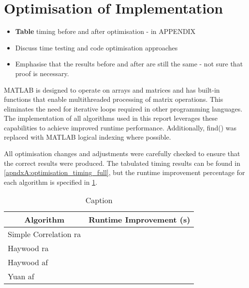 \documentclass[class=report,11pt,crop=false]{standalone}
\begin{document}
\section{Optimisation of Implementation \label{sec:V&V_optimisation}}
\begin{itemize}
    \item \textbf{Table} timing before and after optimisation - in APPENDIX
    \item Discuss time testing and code optimisation approaches
    \item Emphasise that the results before and after are still the same - not sure that proof is necessary.
\end{itemize}
\textsc{MATLAB} is designed to operate on arrays and matrices and has built-in functions that enable multithreaded processing of matrix operations. This eliminates the need for iterative loops required in other programming languages. The implementation of all algorithms used in this report leverages these capabilities to achieve improved runtime performance.  Additionally, find() was replaced with \textsc{MATLAB} logical indexing \cite{matlab_logical_indexing} where possible. 

All optimisation changes and adjustments were carefully checked to ensure that the correct results were produced. The tabulated timing results can be found in \autoref{apndxA:optimisation_timing_full}, but the runtime improvement percentage for each algorithm is specified in \ref{tab:optimisation_timing}.

\begin{table}
    \centering
    \begin{tabular}{|l|c|}
        \hline
        \multicolumn{1}{|c|}{\textbf{Algorithm}} & \textbf{Runtime Improvement (s)} \\
        \hline
        Simple Correlation \gls{ra}    & \\
        \hline
        Haywood \gls{ra}               & \\
        \hline
        Haywood \gls{af}               & \\
        \hline
        Yuan \gls{af}                  & \\
        \hline
    \end{tabular}
    \caption{Caption \label{tab:optimisation_timing}}
\end{table}



\end{document}
